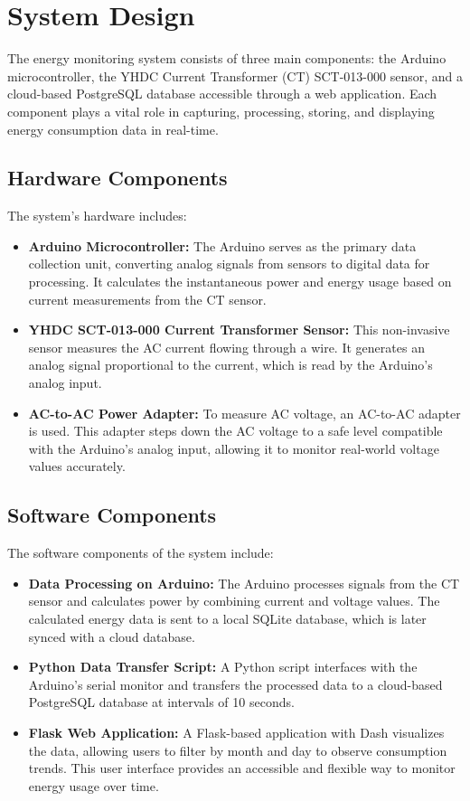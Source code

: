 \section{System Design}
\label{sec:system_design}

\noindent The energy monitoring system consists of three main components: 
the Arduino microcontroller, the YHDC Current Transformer (CT) SCT-013-000 sensor, and a cloud-based PostgreSQL database accessible through a web application. Each component plays a vital role in capturing, processing, storing, and displaying energy consumption data in real-time.

\subsection{Hardware Components}
\noindent The system's hardware includes:
\begin{itemize}
    \item \textbf{Arduino Microcontroller:} The Arduino serves as the primary data collection unit, converting analog signals from sensors to digital data for processing. It calculates the instantaneous power and energy usage based on current measurements from the CT sensor.
    \item \textbf{YHDC SCT-013-000 Current Transformer Sensor:} This non-invasive sensor measures the AC current flowing through a wire. It generates an analog signal proportional to the current, which is read by the Arduino's analog input.
    \item \textbf{AC-to-AC Power Adapter:} To measure AC voltage, an AC-to-AC adapter is used. This adapter steps down the AC voltage to a safe level compatible with the Arduino's analog input, allowing it to monitor real-world voltage values accurately.
\end{itemize}

\subsection{Software Components}
\noindent The software components of the system include:
\begin{itemize}
    \item \textbf{Data Processing on Arduino:} The Arduino processes signals from the CT sensor and calculates power by combining current and voltage values. The calculated energy data is sent to a local SQLite database, which is later synced with a cloud database.
    \item \textbf{Python Data Transfer Script:} A Python script interfaces with the Arduino's serial monitor and transfers the processed data to a cloud-based PostgreSQL database at intervals of 10 seconds.
    \item \textbf{Flask Web Application:} A Flask-based application with Dash visualizes the data, allowing users to filter by month and day to observe consumption trends. This user interface provides an accessible and flexible way to monitor energy usage over time.
\end{itemize}

